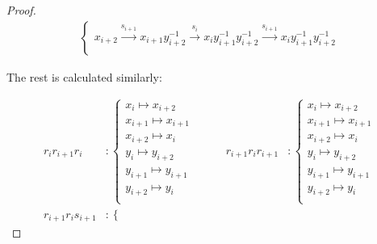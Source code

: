 \documentclass{article}
\begin{document}
\begin{proof}
\begin{align*}
\begin{cases}
x_{i+2}\xrightarrow{s_{i+1}} x_{i+1}y_{i+2}^{-1}\xrightarrow{s_{i}} x_iy_{i+1}^{-1}y_{i+2}^{-1}\xrightarrow{s_{i+1}} x_iy_{i+1}^{-1}y_{i+2}^{-1}\\

\end{cases} 

\end{align*}



The rest is calculated similarly:



\begin{align*}

r_ir_{i+1}r_i &:

\begin{cases}

x_i\mapsto x_{i+2}\\

x_{i+1}\mapsto x_{i+1}\\

x_{i+2}\mapsto x_i\\

y_{i} \mapsto y_{i+2}\\

y_{i+1} \mapsto y_{i+1}\\

y_{i+2} \mapsto y_{i}\\

\end{cases} &\qquad

r_{i+1}r_ir_{i+1} &:

\begin{cases}

x_i\mapsto x_{i+2}\\

x_{i+1}\mapsto x_{i+1}\\

x_{i+2}\mapsto x_i\\

y_{i} \mapsto y_{i+2}\\

y_{i+1} \mapsto y_{i+1}\\

y_{i+2} \mapsto y_{i}\\

\end{cases} \\ 

r_{i+1}r_is_{i+1} &:

\begin{cases}


\end{cases}
\end{align*}
\end{proof}
\end{document}
